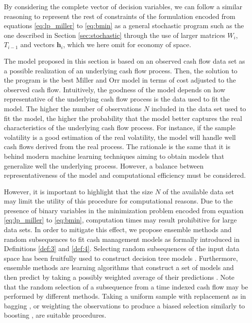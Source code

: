 By considering the complete vector of decision variables, we can follow a similar reasoning to represent the rest of constraints of the formulation encoded from equations \eqref{eq:lp_miller} to \eqref{eq:bmin} as a general stochastic program such as the one described in Section \ref{sec:stochastic} through the use of larger matrices $W_i$, $T_{i-1}$ and vectors $\boldsymbol{h}_i$, which we here omit for economy of space.


The model proposed in this section is based on an observed cash flow data set as a possible realization of an underlying cash flow process. Then, the solution to the program is the best Miller and Orr model in terms of cost adjusted to the observed cash flow. Intuitively, the goodness of the model depends on how representative of the underlying cash flow process is the data used to fit the model. The higher the number of observations $N$ included in the data set used to fit the model, the higher the probability that the model better captures the real characteristics of the underlying cash flow process. For instance, if the sample volatility is a good estimation of the real volatility, the model will handle well cash flows derived from the real process. The rationale is the same that it is behind modern machine learning techniques aiming to obtain models that generalize well the underlying process. However, a balance between representativeness of the model and computational efficiency must be considered.


However, it is important to highlight that the size $N$ of the available data set may limit the utility of this procedure for computational reasons. Due to the presence of binary variables in the minimization problem encoded from equation \eqref{eq:lp_miller} to \eqref{eq:bmin}, computation times may result prohibitive for large data sets. In order to mitigate this effect, we propose ensemble methods and random subsequences to fit cash management models as formally introduced in Definitions \ref{def:3} and \ref{def:4}. Selecting random subsequences of the input data space has been fruitfully used to construct decision tree models \citep{ho1998random,breiman2001random}. Furthermore, ensemble methods are learning algorithms that construct a set of models and then predict by taking a possibly weighted average of their predictions \citep{dietterich2000ensemble}. Note that the random selection of a subsequence from a time indexed cash flow may be performed by different methods. Taking a uniform sample with replacement as in bagging \citep{breiman1996bagging}, or weighting the observations to produce a biased selection similarly to boosting \citep{freund1996experiments}, are suitable procedures.


